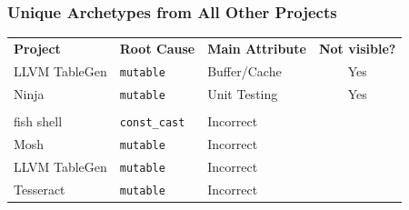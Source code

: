 \documentclass[aspectratio=169]{beamer}
\begin{document}
  \begin{frame}
    \frametitle{Unique Archetypes from All Other Projects}
    \Large
    \begin{tabular}{l p{2.65cm} p{4cm} c}
      \textbf{Project} & \textbf{Root Cause}
      & \textbf{Main Attribute} & \textbf{Not visible?} \\

      LLVM TableGen & \texttt{mutable} & Buffer/Cache & Yes \\
      Ninja & \texttt{mutable} & Unit Testing & Yes \\
      & & & \\
      fish shell & \texttt{const\_cast} & Incorrect & \\
      Mosh & \texttt{mutable} & Incorrect & \\
      LLVM TableGen & \texttt{mutable} & Incorrect & \\
      Tesseract & \texttt{mutable} & Incorrect & \\
    \end{tabular}
  \end{frame}
\end{document}
